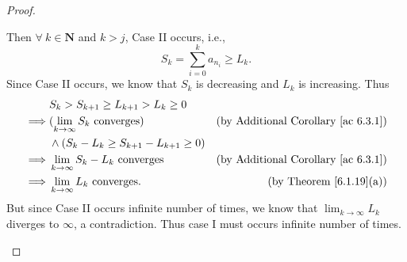 \begin{proof}
\begin{itemize}
\[              \]
              Then \(\forall\ k \in \mathbf{N}\) and \(k > j\), Case II occurs, i.e.,
              \[
                  S_k = \sum_{i = 0}^k a_{n_i} \geq L_k.
              \]
              Since Case II occurs, we know that \(S_k\) is decreasing and \(L_k\) is increasing.
              Thus
              \begin{align*}
                           & S_k > S_{k + 1} \geq L_{k + 1} > L_k \geq 0                                                           \\
                  \implies & (\lim_{k \to \infty} S_k \text{ converges})         & \text{(by Additional Corollary \ref{ac 6.3.1})} \\
                           & \land (S_k - L_k \geq S_{k + 1} - L_{k + 1} \geq 0)                                                   \\
                  \implies & \lim_{k \to \infty} S_k - L_k \text{ converges}     & \text{(by Additional Corollary \ref{ac 6.3.1})} \\
                  \implies & \lim_{k \to \infty} L_k \text{ converges}.          & \text{(by Theorem \ref{6.1.19}(a))}
              \end{align*}
              But since Case II occurs infinite number of times, we know that \(\lim_{k \to \infty} L_k\) diverges to \(\infty\), a contradiction.
              Thus case I must occurs infinite number of times.


\end{itemize}
\end{proof}
